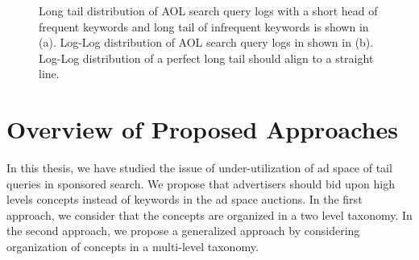 \begin{figure}
  \centering
  \qquad
  \caption{Long tail distribution of AOL search query logs with a short head of frequent keywords and long tail of infrequent keywords is shown in (a). Log-Log distribution of AOL search query logs in shown in (b). Log-Log distribution of a perfect long tail should align to a straight line.}
  \label{longTail}
\end{figure}


\section{Overview of Proposed Approaches}
In this thesis, we have studied the issue of under-utilization of ad space of tail queries in sponsored search. We propose that advertisers should bid upon high levels concepts instead of keywords in the ad space auctions. In the first approach, we consider that the concepts are organized in a two level taxonomy. In the second approach, we propose a generalized approach by considering organization of concepts in a multi-level taxonomy. 


